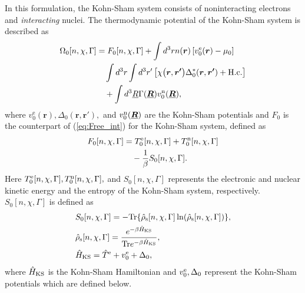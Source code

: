 In this formulation, the Kohn-Sham system consists of noninteracting electrons and {\it interacting} nuclei. 
The thermodynamic potential of the Kohn-Sham system is described as
%
\begin{equation} %
\label{eq:grand_pot_KS}
\begin{split}
	\Omega_0[n, \chi, \Gamma] &= F_0[n, \chi, \Gamma] + \int d^3r n(\bm{r}) \left[v^{\rm e}_0(\bm{r})-\mu_0 \right] \\
						&\quad \int d^3r \int d^3r' \left[\chi \bigl(\bm{r}, \bm{r'} \bigr)
	                                       \Delta^{\ast}_0(\bm{r}, \bm{r'}) + {\rm H.c.} \right]\\
	                   &\quad+ \int d^3\underline{R} \Gamma(\underline{\bm{R}})v^{\rm n}_0(\underline{\bm{R}}),
\end{split}
\end{equation}
%
where $v^{\mathrm e}_0(\bm{r}), \Delta_0(\bm{r}, \bm{r'}),$ and $v^{\rm n}_{0}(\underline{\bm R})$ 
are the Kohn-Sham potentials and $F_0$ is the counterpart of (\ref{eq:Free_int}) for the 
Kohn-Sham system, defined as
%
\begin{equation} %
\begin{split}
	F_0[n, \chi, \Gamma] &= T^{\rm e}_0[n, \chi, \Gamma] + T^{\rm n}_0[n, \chi, \Gamma] \\
	                                     &\quad - \frac{1}{\beta}S_0[n, \chi, \Gamma].
\end{split}
\end{equation}
%
Here $T^{\rm e}_0[n, \chi, \Gamma], T^{\rm n}_0[n, \chi, \Gamma],$ and $S_0[n, \chi, \Gamma]$ 
represents the electronic and nuclear kinetic energy and the entropy of the Kohn-Sham system, respectively.
$S_0[n, \chi, \Gamma]$ is defined as 
%
\begin{equation}
	\begin{split}
	& S_0[n, \chi, \Gamma] = -{\rm Tr}\{\hat{\rho}_{\rm s}[n, \chi, \Gamma]
	\ln(\hat{\rho}_{\rm s}[n, \chi, \Gamma])\}, \\
	& \hat{\rho}_{\rm s}[n, \chi, \Gamma] = \frac{e^{-\beta\hat{H}_{\rm KS}}}
	{ {\rm Tr}e^{-\beta\hat{H}_{\rm KS}}}, \\
	& \hat{H}_{\rm KS} = \hat{T}^{\rm e} + v^{\rm e}_0 + \Delta_0,
	\label{eq:KSentropydef}
\end{split}
\end{equation}
%
where $\hat{H}_{\rm KS}$ is the Kohn-Sham Hamiltonian and $v^{\rm e}_0, \Delta_0$ represent the 
Kohn-Sham potentials which are defined below.

